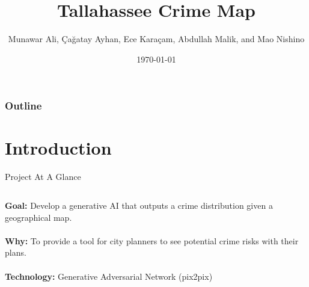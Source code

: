 \documentclass{beamer}
\title{Tallahassee Crime Map}
\author{Munawar Ali, Çağatay Ayhan, Ece Karaçam, Abdullah Malik, and Mao Nishino}
\date{\today}
\begin{document}
\begin{frame}
    \titlepage
\end{frame}

\begin{frame}
    \frametitle{Outline}
    \tableofcontents
\end{frame}


\section{Introduction}
\begin{frame}{Project At A Glance}

    \begin{columns}[T] %

        \begin{column}{.5\textwidth}
            \textbf{Goal:} Develop a generative AI that outputs a crime distribution given a geographical map.\\
            \quad \\
            \textbf{Why:} To provide a tool for city planners to see potential crime risks with their plans.\\
            \quad \\
            \textbf{Technology:} Generative Adversarial Network (pix2pix)
        \end{column}


\end{columns}
\end{frame}
\end{document}
